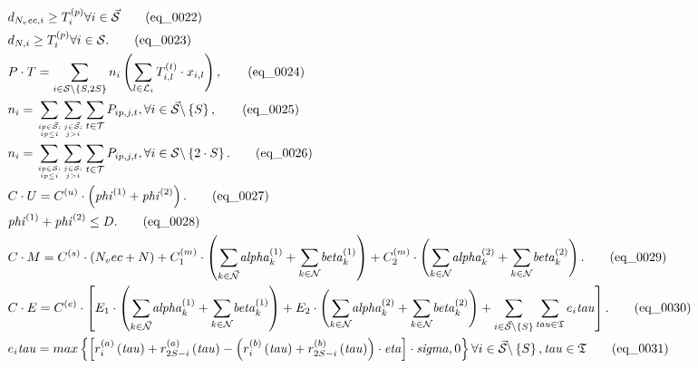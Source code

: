 \begin{align}
  & d_{N_vec , i} \geq T_{i}^{\left(p\right)} \forall i \in \vec{\mathcal{S}} \tag{eq\_0022} \\
  & d_{{N} , i} \geq T_{i}^{\left(p\right)} \forall i \in {\mathcal{S}} . \tag{eq\_0023} \\
  &  P \cdot T = \sum_{i \in \mathcal{S} \backslash \left\{S , 2 S\right\}} n_{i} \left(\sum_{l \in \mathcal{L}_{i}} T_{i , l}^{\left(t\right)} \cdot x_{i , l}\right) ,  \tag{eq\_0024} \\
  & n_{i} = \underset{\genfrac{}{}{0pt}{}{ip \in \vec{\mathcal{S}} ;}{ip \leq i}}{\sum} \underset{\genfrac{}{}{0pt}{}{j \in \vec{\mathcal{S}} ;}{j > i}}{\sum} \sum_{t \in \mathcal{T}} P_{ip , j , t} , \forall i \in \vec{\mathcal{S}} \backslash \left\{S\right\} , \tag{eq\_0025} \\
  & n_{i} = \underset{\genfrac{}{}{0pt}{}{ip \in {\mathcal{S}} ;}{ip \leq i}}{\sum} \underset{\genfrac{}{}{0pt}{}{j \in {\mathcal{S}} ;}{j > i}}{\sum} \sum_{t \in \mathcal{T}} P_{ip , j , t} , \forall i \in {\mathcal{S}} \backslash \left\{2 \cdot S\right\} . \tag{eq\_0026} \\
  & C \cdot U = C^{\left(u\right)} \cdot \left(\mathit{phi}^{\left(1\right)} + \mathit{phi}^{\left(2\right)}\right) . \tag{eq\_0027} \\
  & \mathit{phi}^{\left(1\right)} + \mathit{phi}^{\left(2\right)} \leq D . \tag{eq\_0028} \\
  & C \cdot M = C^{\left(s\right)} \cdot \left(N_vec + {N}\right) + C_{1}^{\left(m\right)} \cdot \left(\underset{k \in \vec{\mathcal{N}}}{\sum} \mathit{alpha}_{k}^{\left(1\right)} + \underset{k \in {\mathcal{N}}}{\sum} \mathit{beta}_{k}^{\left(1\right)}\right) + C_{2}^{\left(m\right)} \cdot \left(\underset{k \in {\mathcal{N}}}{\sum} \mathit{alpha}_{k}^{\left(2\right)} + \underset{k \in {\mathcal{N}}}{\sum} \mathit{beta}_{k}^{\left(2\right)}\right) . \tag{eq\_0029} \\
  & C \cdot E = C^{\left(e\right)} \cdot \left[E_{1} \cdot \left(\underset{k \in \vec{\mathcal{N}}}{\sum} \mathit{alpha}_{k}^{\left(1\right)} + \underset{k \in {\mathcal{N}}}{\sum} \mathit{beta}_{k}^{\left(1\right)}\right) + E_{2} \cdot \left(\underset{k \in {\mathcal{N}}}{\sum} \mathit{alpha}_{k}^{\left(2\right)} + \underset{k \in {\mathcal{N}}}{\sum} \mathit{beta}_{k}^{\left(2\right)}\right) + \underset{i \in \vec{\mathcal{S}} \backslash \left\{S\right\}}{\sum} \sum_{\mathit{tau} \in \mathfrak{T}} e_{i} \mathit{tau}\right] . \tag{eq\_0030} \\
  & e_{i} \mathit{tau} = max \left\{\left[r_{i}^{\left(a\right)} \left(\mathit{tau}\right) + r_{2 S - i}^{\left(a\right)} \left(\mathit{tau}\right) - \left(r_{i}^{\left(b\right)} \left(\mathit{tau}\right) + r_{2 S - i}^{\left(b\right)} \left(\mathit{tau}\right)\right) \cdot \mathit{eta}\right] \cdot \mathit{sigma} , 0\right\} \forall i \in \vec{\mathcal{S}} \backslash \left\{S\right\} , \mathit{tau} \in \mathfrak{T} \tag{eq\_0031} \\

\end{align}
